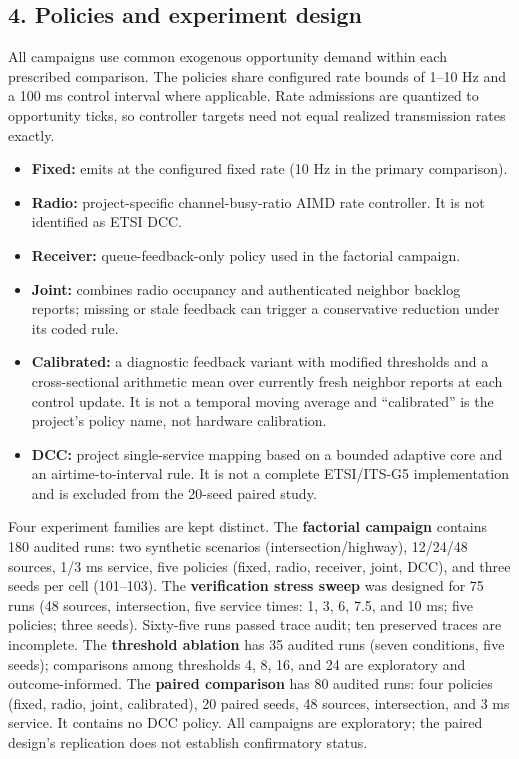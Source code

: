 \documentclass[
]{article}
\providecommand{\tightlist}{%
  \setlength{\itemsep}{0pt}\setlength{\parskip}{0pt}}
\begin{document}
\subsection{4. Policies and experiment
design}\label{policies-and-experiment-design}

All campaigns use common exogenous opportunity demand within each
prescribed comparison. The policies share configured rate bounds of
1--10 Hz and a 100 ms control interval where applicable. Rate admissions
are quantized to opportunity ticks, so controller targets need not equal
realized transmission rates exactly.

\begin{itemize}
\tightlist
\item
  \textbf{Fixed:} emits at the configured fixed rate (10 Hz in the
  primary comparison).
\item
  \textbf{Radio:} project-specific channel-busy-ratio AIMD rate
  controller. It is not identified as ETSI DCC.
\item
  \textbf{Receiver:} queue-feedback-only policy used in the factorial
  campaign.
\item
  \textbf{Joint:} combines radio occupancy and authenticated neighbor
  backlog reports; missing or stale feedback can trigger a conservative
  reduction under its coded rule.
\item
  \textbf{Calibrated:} a diagnostic feedback variant with modified
  thresholds and a cross-sectional arithmetic mean over currently fresh
  neighbor reports at each control update. It is not a temporal moving
  average and ``calibrated'' is the project's policy name, not hardware
  calibration.
\item
  \textbf{DCC:} project single-service mapping based on a bounded
  adaptive core and an airtime-to-interval rule. It is not a complete
  ETSI/ITS-G5 implementation and is excluded from the 20-seed paired
  study.
\end{itemize}

Four experiment families are kept distinct. The \textbf{factorial
campaign} contains 180 audited runs: two synthetic scenarios
(intersection/highway), 12/24/48 sources, 1/3 ms service, five policies
(fixed, radio, receiver, joint, DCC), and three seeds per cell
(101--103). The \textbf{verification stress sweep} was designed for 75
runs (48 sources, intersection, five service times: 1, 3, 6, 7.5, and 10
ms; five policies; three seeds). Sixty-five runs passed trace audit; ten
preserved traces are incomplete. The \textbf{threshold ablation} has 35
audited runs (seven conditions, five seeds); comparisons among
thresholds 4, 8, 16, and 24 are exploratory and outcome-informed. The
\textbf{paired comparison} has 80 audited runs: four policies (fixed,
radio, joint, calibrated), 20 paired seeds, 48 sources, intersection,
and 3 ms service. It contains no DCC policy. All campaigns are
exploratory; the paired design's replication does not establish
confirmatory status.
\end{document}
